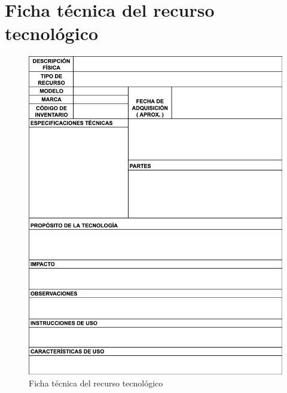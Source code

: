 \appendix
\chapter{Ficha técnica del recurso tecnológico}
\label{apendice:ficha}
\begin{figure}[htbp]
    \centering
    \includegraphics[width=\textwidth,height=0.85\textheight,keepaspectratio]{apendices/caracterizacionInfraestructura.png}
    \caption{Ficha técnica del recurso tecnológico}
    \label{fig:tabla-ficha-tecnica}
\end{figure}